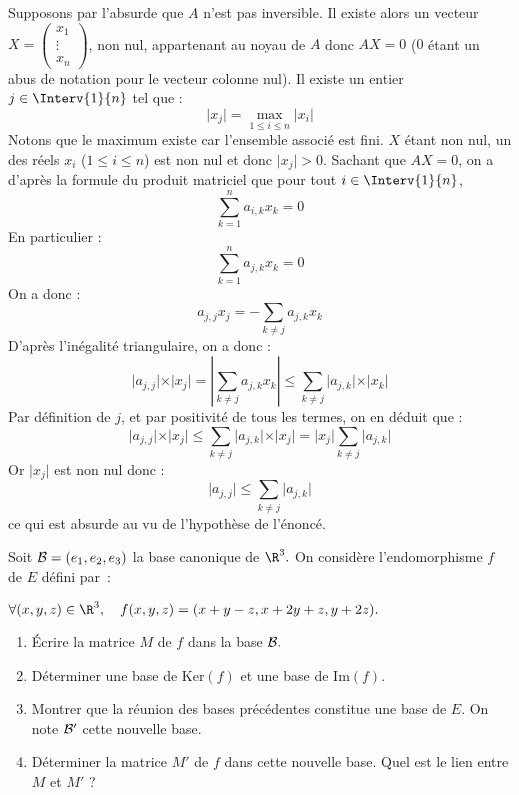 \documentclass[a4paper,10pt]{report}
\begin{document}
\corr Supposons par l'absurde que $A$ n'est pas inversible. Il existe alors un vecteur $X = \begin{pmatrix}
x_1 \\
\vdots \\
x_n
\end{pmatrix}$, non nul, appartenant au noyau de $A$ donc $AX= 0$ ($0$ étant un abus de notation pour le vecteur colonne nul). Il existe un entier $j \in \Interv{1}{n}$ tel que :
$$ \vert x_j \vert = \max_{1 \leq i \leq n} \vert x_i \vert$$
Notons que le maximum existe car l'ensemble associé est fini. $X$ étant non nul, un des réels $x_i$ ($1 \leq i \leq n$) est non nul et donc $\vert x_j \vert >0$. Sachant que $AX=0$, on a d'après la formule du produit matriciel que pour tout $i \in \Interv{1}{n}$,
$$ \sum_{k=1}^n a_{i,k} x_k = 0$$
En particulier :
$$ \sum_{k=1}^n a_{j,k} x_k = 0$$
On a donc :
$$ a_{j,j} x_j = - \sum_{k \neq j} a_{j,k} x_k$$
D'après l'inégalité triangulaire, on a donc :
$$ \vert a_{j,j} \vert \times \vert x_j \vert = \left\vert  \sum_{k \neq j} a_{j,k} x_k \right\vert \leq \sum_{k \neq j} \vert a_{j,k} \vert \times \vert x_k \vert$$
Par définition de $j$, et par positivité de tous les termes, on en déduit que :
$$  \vert a_{j,j} \vert \times \vert x_j \vert \leq \sum_{k \neq j} \vert a_{j,k} \vert \times \vert x_j \vert =  \vert x_j \vert\sum_{k \neq j} \vert a_{j,k} \vert$$
Or $\vert x_j \vert$ est non nul donc :
$$ \vert a_{j,j} \vert  \leq  \sum_{k \neq j} \vert a_{j,k} \vert$$
ce qui est absurde au vu de l'hypothèse de l'énoncé.

\begin{Exercice}{} Soit ${\cal B}=(e_1,e_2,e_3)$ la base canonique de $\R^3.$ On consid\`ere
l'endomorphisme $f$ de $E$ d\'efini par~:

\begin{center}
$\forall (x,y,z)\in\R^3,\quad f(x,y,z)=(x+y-z,x+2y+z,y+2z).$
\end{center}

\begin{enumerate}

\item Écrire la matrice $M$ de $f$ dans la base ${\cal B}.$

\item D\'eterminer une base de $\textrm{Ker}(f)$ et une base de $\textrm{Im}(f)$.

\item Montrer que la r\'eunion des bases pr\'ec\'edentes constitue une base de $E$. On note ${\cal B}'$ cette nouvelle base.

\item  D\'eterminer la matrice $M'$ de $f$ dans cette nouvelle base. Quel est le lien entre $M$ et $M'$ ?
\end{enumerate}

\end{Exercice}
\end{document}
